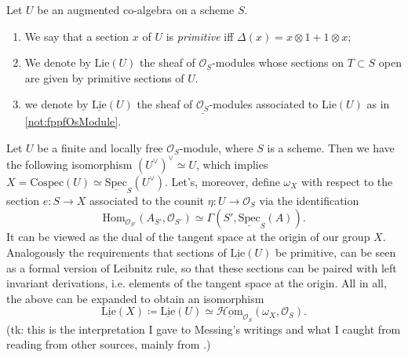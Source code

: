 \documentclass[../Main]{subfiles}
\begin{document}
\begin{defn}[]
	Let $U$ be an augmented co-algebra on a scheme $S$.
\begin{enumerate}
\item We say that a section $x$ of $U$ is {\em primitive} iff
	$\Delta(x) = x \otimes 1 + 1 \otimes x$;

\item We denote by $\mathrm{Lie}(U)$ the sheaf of $\mathcal{O}_{ S }$-modules
	whose sections on $T \subset S$ open are given by
	primitive sections of $U$.

\item we denote by $\underline{\mathrm{Lie}}(U)$ the sheaf of $\underline{\mathcal{O}_{ S }}$-modules
	associated to $\mathrm{Lie}(U)$ as in \cref{not:fppfOsModule}.
\end{enumerate}
\end{defn}


\begin{rem}
	Let $U$ be a finite and locally free $\mathcal{O}_{ S }$-module,
	where $S$ is a scheme.
	Then we have the following isomorphism $(U^\vee)^\vee \simeq U$,
	which implies $X = \mathrm{Cospec}(U) \simeq 
	\underline{\mathrm{Spec}}_S(U^\vee)$.
	Let's, moreover, define $\omega_X$ with respect to the section $e\colon S \to X$
	associated to the counit $\eta\colon U \to \mathcal{O}_{ S }$
	via the identification
	\begin{equation*}
		\mathrm{Hom}_{ \mathcal{O}_{ S' }}
		\left( A_{S'}, \mathcal{O}_{ S' } \right) 
		\simeq
		\Gamma(S', \underline{\mathrm{Spec}}_S(A))
	.\end{equation*}
	It can be viewed as the dual of the tangent space at the origin
	of our group $X$.
	Analogously the requirements that sections of $\underline{\mathrm{Lie}}(U)$
	be primitive, can be seen as a formal version of Leibnitz rule,
	so that these sections can be paired with left invariant derivations, i.e.
	elements of the tangent space at the origin.
	All in all, the above can be expanded to obtain an isomorphism
	\begin{equation*}
		\underline{\mathrm{Lie}}(X) \coloneqq
		\underline{\mathrm{Lie}}(U) \simeq
		\underline{\mathcal{H}\mathrm{om}}_{ \mathcal{O}_{ S } } 
		\left(\omega_X , \mathcal{O}_{ S } \right)
	.\end{equation*}
	(tk: this is the interpretation I gave to Messing's writings
	and what I caught from reading from other sources, mainly
	from \cite{MilneAG}.)
\end{rem}
\end{document}
